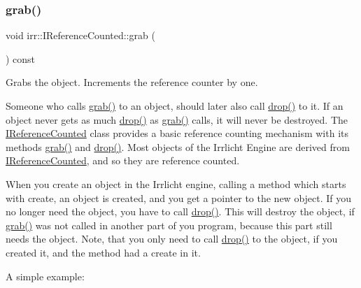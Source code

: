 \subsubsection{\texorpdfstring{grab()}{grab()}\hspace{0.1cm}{\footnotesize\ttfamily [1/2]}}
{\footnotesize\ttfamily void irr\+::\+I\+Reference\+Counted\+::grab (\begin{DoxyParamCaption}{ }\end{DoxyParamCaption}) const\hspace{0.3cm}{\ttfamily [inline]}}



Grabs the object. Increments the reference counter by one. 

Someone who calls \hyperlink{classirr_1_1IReferenceCounted_a396f9cdbe311ada278626477b3c6f0f5}{grab()} to an object, should later also call \hyperlink{classirr_1_1IReferenceCounted_a03856a09355b89d178090c4a5f738543}{drop()} to it. If an object never gets as much \hyperlink{classirr_1_1IReferenceCounted_a03856a09355b89d178090c4a5f738543}{drop()} as \hyperlink{classirr_1_1IReferenceCounted_a396f9cdbe311ada278626477b3c6f0f5}{grab()} calls, it will never be destroyed. The \hyperlink{classirr_1_1IReferenceCounted}{I\+Reference\+Counted} class provides a basic reference counting mechanism with its methods \hyperlink{classirr_1_1IReferenceCounted_a396f9cdbe311ada278626477b3c6f0f5}{grab()} and \hyperlink{classirr_1_1IReferenceCounted_a03856a09355b89d178090c4a5f738543}{drop()}. Most objects of the Irrlicht Engine are derived from \hyperlink{classirr_1_1IReferenceCounted}{I\+Reference\+Counted}, and so they are reference counted.

When you create an object in the Irrlicht engine, calling a method which starts with \textquotesingle{}create\textquotesingle{}, an object is created, and you get a pointer to the new object. If you no longer need the object, you have to call \hyperlink{classirr_1_1IReferenceCounted_a03856a09355b89d178090c4a5f738543}{drop()}. This will destroy the object, if \hyperlink{classirr_1_1IReferenceCounted_a396f9cdbe311ada278626477b3c6f0f5}{grab()} was not called in another part of you program, because this part still needs the object. Note, that you only need to call \hyperlink{classirr_1_1IReferenceCounted_a03856a09355b89d178090c4a5f738543}{drop()} to the object, if you created it, and the method had a \textquotesingle{}create\textquotesingle{} in it.

A simple example\+:

